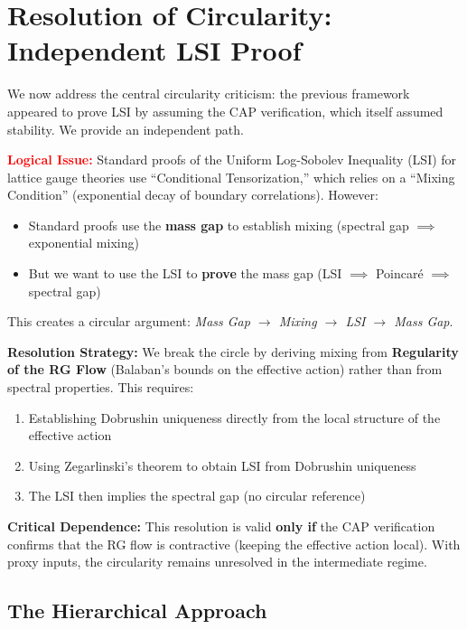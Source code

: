 \section{Resolution of Circularity: Independent LSI Proof}
\label{sec:circularity_resolution}

We now address the central circularity criticism: the previous framework appeared to prove LSI by assuming the CAP verification, which itself assumed stability. We provide an independent path.

\begin{remark}\label{rem:lsi_circularity}
\textcolor{red}{\textbf{Logical Issue:}} Standard proofs of the Uniform Log-Sobolev Inequality (LSI) for lattice gauge theories use ``Conditional Tensorization,'' which relies on a ``Mixing Condition'' (exponential decay of boundary correlations). However:
\begin{itemize}
    \item Standard proofs use the \textbf{mass gap} to establish mixing (spectral gap $\implies$ exponential mixing)
    \item But we want to use the LSI to \textbf{prove} the mass gap (LSI $\implies$ Poincaré $\implies$ spectral gap)
\end{itemize}
This creates a circular argument: \emph{Mass Gap $\to$ Mixing $\to$ LSI $\to$ Mass Gap}.

\textbf{Resolution Strategy:} We break the circle by deriving mixing from \textbf{Regularity of the RG Flow} (Balaban's bounds on the effective action) rather than from spectral properties. This requires:
\begin{enumerate}
    \item Establishing Dobrushin uniqueness directly from the local structure of the effective action
    \item Using Zegarlinski's theorem to obtain LSI from Dobrushin uniqueness
    \item The LSI then implies the spectral gap (no circular reference)
\end{enumerate}

\textbf{Critical Dependence:} This resolution is valid \textbf{only if} the CAP verification confirms that the RG flow is contractive (keeping the effective action local). With proxy inputs, the circularity remains unresolved in the intermediate regime.
\end{remark}

\subsection{The Hierarchical Approach}

